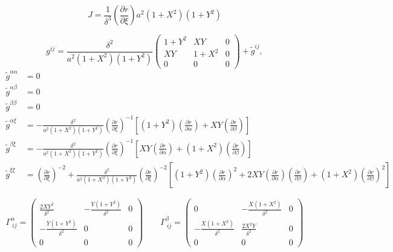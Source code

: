 \documentclass{article}
\newcommand{\pdiff}[2]{\frac{\partial #1}{\partial #2}}
\begin{document}
\begin{equation}
J = \frac{1}{\delta^3} \left( \pdiff{r}{\xi} \right) a^2 (1+X^2) (1+Y^2)
\end{equation}

\begin{equation}
g^{ij} = \frac{\delta^2}{a^2 (1+X^2) (1+Y^2)} \left( \begin{array}{ccc} 1+Y^2 & X Y & 0 \\[2.0ex] X Y & 1+X^2 & 0 \\[2.0ex] 0 & 0 & 0 \end{array} \right) + \tilde{g}^{ij},
\end{equation}
\begin{align}
\tilde{g}^{\alpha \alpha} &= 0 \\
\tilde{g}^{\alpha \beta} &= 0 \\
\tilde{g}^{\beta \beta} &= 0 \\
\tilde{g}^{\alpha \xi} &= - \frac{\delta^2}{a^2 (1+X^2) (1+Y^2)} \left( \pdiff{r}{\xi} \right)^{-1} \left[ (1+Y^2) \left( \pdiff{r}{\alpha} \right) + X Y \left( \pdiff{r}{\beta} \right) \right] \\
\tilde{g}^{\beta \xi} &= - \frac{\delta^2}{a^2 (1+X^2) (1+Y^2)} \left( \pdiff{r}{\xi} \right)^{-1} \left[ X Y \left( \pdiff{r}{\alpha} \right) + (1+X^2) \left( \pdiff{r}{\beta} \right) \right] \\
\tilde{g}^{\xi \xi} &= \left( \pdiff{r}{\xi} \right)^{-2} + \frac{\delta^2}{a^2 (1+X^2) (1+Y^2)} \left( \pdiff{r}{\xi} \right)^{-2} \left[ (1+Y^2) \left( \pdiff{r}{\alpha} \right)^2 + 2 X Y \left( \pdiff{r}{\alpha} \right) \left( \pdiff{r}{\beta} \right) + (1+X^2) \left( \pdiff{r}{\beta} \right)^2 \right]
\end{align}

\begin{equation}
\Gamma^{\alpha}_{\ i j} = \left( \begin{array}{ccc} \displaystyle \frac{2 X Y^2}{\delta^2} & \displaystyle - \frac{Y (1+Y^2)}{\delta^2} & 0 \\[2.0ex] \displaystyle - \frac{Y (1+Y^2)}{\delta^2} & 0 & 0 \\[2.0ex] 0 & 0 & 0 \end{array} \right) \qquad \Gamma^{\beta}_{\ i j} = \left( \begin{array}{ccc} \displaystyle 0 & \displaystyle - \frac{X (1+X^2)}{\delta^2} & 0 \\[2.0ex] \displaystyle - \frac{X (1+X^2)}{\delta^2} & \displaystyle \frac{2 X^2 Y}{\delta^2} & 0 \\[2.0ex] 0 & 0 & 0 \end{array} \right)
\end{equation}
\end{document}

